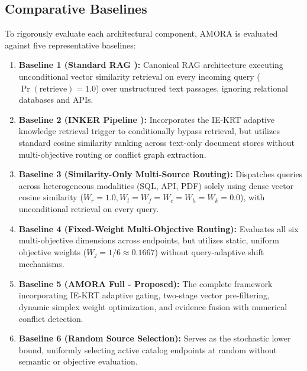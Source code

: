 \subsection{Comparative Baselines}
To rigorously evaluate each architectural component, AMORA is evaluated against five representative baselines:
\begin{enumerate}
    \item \textbf{Baseline 1 (Standard RAG \cite{lewis2020rag}):} Canonical RAG architecture executing unconditional vector similarity retrieval on every incoming query ($\Pr(\text{retrieve}) = 1.0$) over unstructured text passages, ignoring relational databases and APIs.
    \item \textbf{Baseline 2 (INKER Pipeline \cite{inker2024}):} Incorporates the IE-KRT adaptive knowledge retrieval trigger to conditionally bypass retrieval, but utilizes standard cosine similarity ranking across text-only document stores without multi-objective routing or conflict graph extraction.
    \item \textbf{Baseline 3 (Similarity-Only Multi-Source Routing):} Dispatches queries across heterogeneous modalities (SQL, API, PDF) solely using dense vector cosine similarity ($W_r = 1.0, W_l = W_f = W_c = W_h = W_k = 0.0$), with unconditional retrieval on every query.
    \item \textbf{Baseline 4 (Fixed-Weight Multi-Objective Routing):} Evaluates all six multi-objective dimensions across endpoints, but utilizes static, uniform objective weights ($W_j = 1/6 \approx 0.1667$) without query-adaptive shift mechanisms.
    \item \textbf{Baseline 5 (AMORA Full - Proposed):} The complete framework incorporating IE-KRT adaptive gating, two-stage vector pre-filtering, dynamic simplex weight optimization, and evidence fusion with numerical conflict detection.
    \item \textbf{Baseline 6 (Random Source Selection):} Serves as the stochastic lower bound, uniformly selecting active catalog endpoints at random without semantic or objective evaluation.
\end{enumerate}

